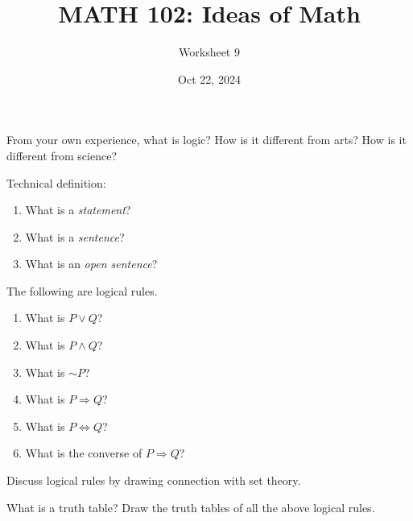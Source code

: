 \documentclass[12pt]{amsart}
\title{ MATH 102: Ideas  of Math }
\author{ Worksheet 9 }
\date{Oct 22, 2024}
\begin{document}
\maketitle

\begin{question}
	From your own experience, what is logic?
	How is it different from arts?
	How is it different from science?

	\vspace{7cm}
\end{question}

\begin{question}
	Technical definition:
	\begin{enumerate}
		\item What is a \emph{statement}?
		      \vspace{3cm}
		\item What is a \emph{sentence}?
		      \vspace{3cm}
		\item What is an \emph{open sentence}?
		      \vspace{3cm}
	\end{enumerate}
\end{question}
\begin{question}
	The following are logical rules.
	\begin{enumerate}
		\item What is $P \vee Q$?
		      \vspace{3cm}
		\item What is $P \wedge Q$?
		      \vspace{3cm}
		\item What is $\sim P$?
		      \vspace{3cm}
		\item What is $P \Rightarrow Q$?
		      \vspace{3cm}
		\item What is $P \Leftrightarrow Q$?
		      \vspace{3cm}
		\item What is the converse of $P \Rightarrow Q$?
		      \vspace{3cm}
	\end{enumerate}
\end{question}

\begin{question}
	Discuss logical rules by drawing connection with set theory.
	\vspace{5cm}
\end{question}


\begin{question}
	What is a truth table?
	Draw the truth tables of all the above logical rules.
\end{question}
\end{document}
